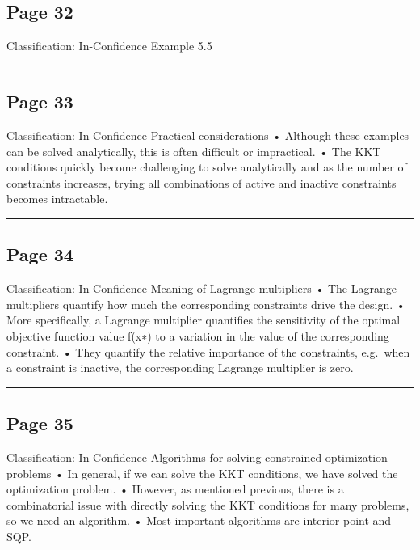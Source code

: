 \documentclass[
]{article}
\begin{document}
\subsection{Page 32}\label{page-32}

Classification: In-Confidence Example 5.5

\begin{center}\rule{0.5\linewidth}{0.5pt}\end{center}

\subsection{Page 33}\label{page-33}

Classification: In-Confidence Practical considerations • Although these
examples can be solved analytically, this is often difficult or
impractical. • The KKT conditions quickly become challenging to solve
analytically and as the number of constraints increases, trying all
combinations of active and inactive constraints becomes intractable.

\begin{center}\rule{0.5\linewidth}{0.5pt}\end{center}

\subsection{Page 34}\label{page-34}

Classification: In-Confidence Meaning of Lagrange multipliers • The
Lagrange multipliers quantify how much the corresponding constraints
drive the design. • More specifically, a Lagrange multiplier quantifies
the sensitivity of the optimal objective function value f(x∗) to a
variation in the value of the corresponding constraint. • They quantify
the relative importance of the constraints, e.g.~when a constraint is
inactive, the corresponding Lagrange multiplier is zero.

\begin{center}\rule{0.5\linewidth}{0.5pt}\end{center}

\subsection{Page 35}\label{page-35}

Classification: In-Confidence Algorithms for solving constrained
optimization problems • In general, if we can solve the KKT conditions,
we have solved the optimization problem. • However, as mentioned
previous, there is a combinatorial issue with directly solving the KKT
conditions for many problems, so we need an algorithm. • Most important
algorithms are interior-point and SQP.
\end{document}
